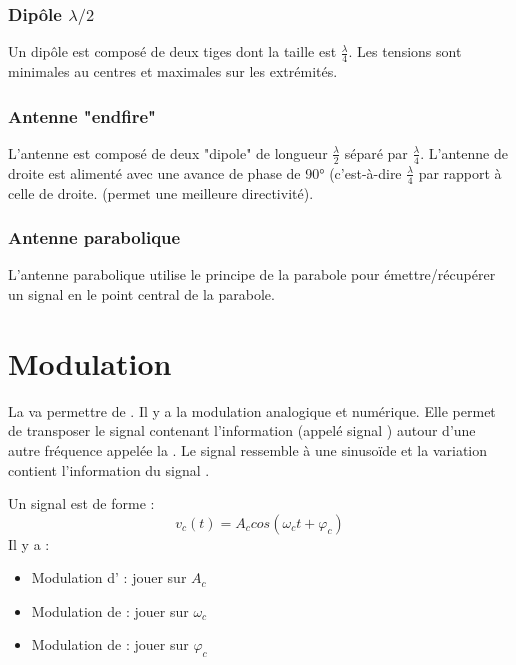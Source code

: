 \subsection{Dipôle $\lambda/2$}

Un dipôle est composé de deux tiges dont la taille est $\frac{\lambda}{4}$.
Les tensions sont minimales au centres et maximales sur les extrémités.

\subsection{Antenne "endfire"}

L'antenne est composé de deux "dipole" de longueur $\frac{\lambda}{2}$ séparé par $\frac{\lambda}{4}$.  L'antenne de droite est alimenté avec une avance de phase de 90° (c'est-à-dire $\frac{\lambda}{4}$ par rapport à celle de droite.  (permet une meilleure directivité).

\subsection{Antenne parabolique}

L'antenne parabolique utilise le principe de la parabole pour émettre/récupérer
un signal en le point central de la parabole.

\chapter{Modulation}

La  va permettre de . Il y a la modulation analogique et numérique. Elle permet de transposer le signal contenant l'information (appelé signal ) autour d'une autre fréquence appelée la . Le signal  ressemble à une sinusoïde et la variation contient l'information du signal .

Un signal est de forme :
\begin{equation*}
v_c(t) = A_c cos(\omega_c t + \varphi_c)
\end{equation*}
Il y a  :
\begin{itemize}
\item Modulation d' : jouer sur $A_c$
\item Modulation de  : jouer sur $\omega_c$
\item Modulation de  : jouer sur $\varphi_c$
\end{itemize}

